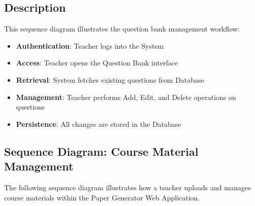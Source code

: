 \documentclass[12pt]{article}
\begin{document}
\subsection*{Description}
This sequence diagram illustrates the question bank management workflow:
\begin{itemize}
	\item \textbf{Authentication}: Teacher logs into the System
	\item \textbf{Access}: Teacher opens the Question Bank interface
	\item \textbf{Retrieval}: System fetches existing questions from Database
	\item \textbf{Management}: Teacher performs Add, Edit, and Delete operations on questions
	\item \textbf{Persistence}: All changes are stored in the Database
\end{itemize}


\subsection{Sequence Diagram: Course Material Management}

The following sequence diagram illustrates how a teacher uploads and manages course materials within the Paper Generator Web Application.
\end{document}
